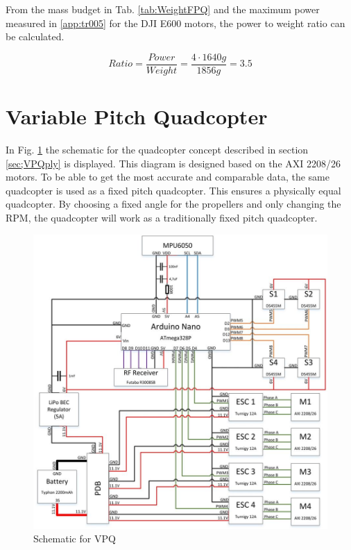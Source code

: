 From the mass budget in Tab. \ref{tab:WeightFPQ} and the maximum power measured in \ref{app:tr005} for the DJI E600 motors, the power to weight ratio can be calculated.

\begin{equation}
    Ratio = \frac{Power}{Weight} = \frac{4\cdot1640g}{1856g}=3.5
\end{equation}

\newpage

\section{Variable Pitch Quadcopter}
In Fig. \ref{fig:vpqsch} the schematic for the quadcopter concept described in section \ref{sec;VPQply} is displayed. This diagram is designed based on the AXI 2208/26 motors. To be able to get the most accurate and comparable data, the same quadcopter is used as a fixed pitch quadcopter. This ensures a physically equal quadcopter. By choosing a fixed angle for the propellers and only changing the RPM, the quadcopter will work as a traditionally fixed pitch quadcopter. 
\begin{figure}[H]
    \centering
    \includegraphics[width = 1\textwidth]{VAPIQ-PICTURES/Shematic}
    \caption{Schematic for VPQ}
    \label{fig:vpqsch}
\end{figure}

